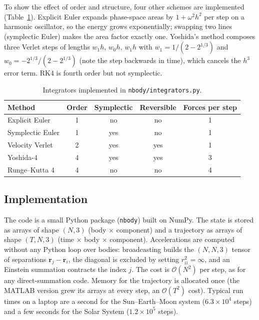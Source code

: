 \documentclass[11pt,a4paper]{article}
\newcommand{\vect}[1]{\mathbf{#1}}
\begin{document}
To show the effect of order and structure, four other schemes are implemented
(Table~\ref{tab:integrators}). Explicit Euler expands phase-space areas by
$1+\omega^2h^2$ per step on a harmonic oscillator, so the energy grows exponentially;
swapping two lines (symplectic Euler) makes the area factor exactly one. Yoshida's method
composes three Verlet steps of lengths $w_1h,\,w_0h,\,w_1h$ with
$w_1=1/(2-2^{1/3})$ and $w_0=-2^{1/3}/(2-2^{1/3})$ (note the step backwards in time),
which cancels the $h^3$ error term. RK4 is fourth order but not symplectic.

\begin{table}[H]
\centering
\caption{Integrators implemented in \texttt{nbody/integrators.py}.}
\label{tab:integrators}
\begin{tabular}{lcccc}
\toprule
Method & Order & Symplectic & Reversible & Forces per step\\
\midrule
Explicit Euler    & 1 & no  & no  & 1\\
Symplectic Euler  & 1 & yes & no  & 1\\
Velocity Verlet   & 2 & yes & yes & 1\\
Yoshida-4         & 4 & yes & yes & 3\\
Runge--Kutta 4    & 4 & no  & no  & 4\\
\bottomrule
\end{tabular}
\end{table}

\subsection{Implementation}

The code is a small Python package (\texttt{nbody}) built on NumPy. The state is stored
as arrays of shape $(N,3)$ (body $\times$ component) and a trajectory as arrays of shape
$(T,N,3)$ (time $\times$ body $\times$ component). Accelerations are computed without any
Python loop over bodies: broadcasting builds the $(N,N,3)$ tensor of separations
$\vect r_j-\vect r_i$, the diagonal is excluded by setting $r_{ii}^2=\infty$, and an
Einstein summation contracts the index $j$. The cost is $\mathcal O(N^2)$ per step, as
for any direct-summation code. Memory for the trajectory is allocated once (the MATLAB
version grew its arrays at every step, an $\mathcal O(T^2)$ cost). Typical run times on a
laptop are a second for the Sun--Earth--Moon system ($6.3\times10^4$ steps) and a few
seconds for the Solar System ($1.2\times10^5$ steps).
\end{document}
